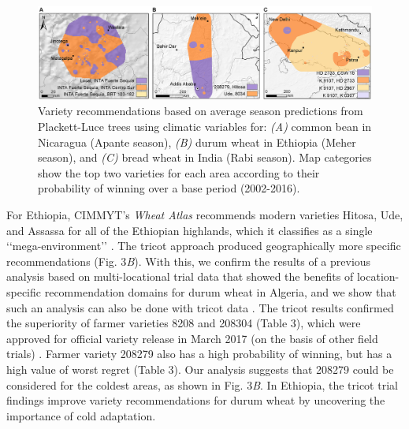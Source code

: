 \documentclass[9pt,twocolumn,twoside]{pnas-new}
\begin{document}
\begin{figure}[ht!]
\centering
\includegraphics[width=1\textwidth]{Fig3_Recommendations.eps}
\caption{Variety recommendations based on average season predictions from Plackett-Luce trees using climatic variables for: \textit{(A)} common bean in Nicaragua (Apante season), \textit{(B)}  durum wheat in Ethiopia (Meher season), and \textit{(C)} bread wheat in India (Rabi season). Map categories show the top two varieties for each area according to their probability of winning over a base period (2002-2016).}
\label{fig:recommendations}
\end{figure}

For Ethiopia, CIMMYT's \textit{Wheat Atlas} recommends modern varieties Hitosa, Ude, and Assassa for all of the Ethiopian highlands, which it classifies as a single ‘‘mega-environment’’ \cite{cimmyt2018atlas}. The tricot approach produced geographically more specific recommendations (Fig. 3\textit{B}). With this, we confirm the results of a previous analysis based on multi-locational trial data that showed the benefits of location-specific recommendation domains for durum wheat in Algeria, and we show that such an analysis can also be done with tricot data \cite{annicchiarico2006repeatable}. The tricot results confirmed the superiority of farmer varieties 8208 and 208304 (Table 3), which were approved for official variety release in March 2017 (on the basis of other field trials) \cite{mengistu2018genetic}. Farmer variety 208279 also has a high probability of winning, but has a high value of worst regret (Table 3). Our analysis suggests that 208279 could be considered for the coldest areas, as shown in Fig. 3\textit{B}. In Ethiopia, the tricot trial findings improve variety recommendations for durum wheat by uncovering the importance of cold adaptation.
\end{document}
